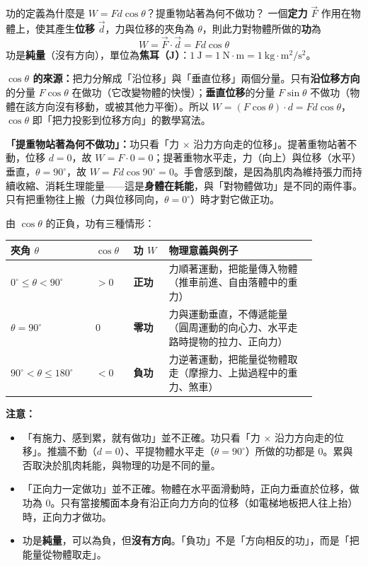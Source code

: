 \documentclass[11pt]{article}
\begin{document}
\begin{補充框}{功的定義為什麼是 $W=Fd\cos\theta$？提重物站著為何不做功？}
一個\textbf{定力} $\vec F$ 作用在物體上，使其產生\textbf{位移} $\vec d$，力與位移的夾角為 $\theta$，則此力對物體所做的\textbf{功}為
$$\boxed{\;W=\vec F\cdot\vec d=Fd\cos\theta\;}$$
功是\textbf{純量}（沒有方向），單位為\textbf{焦耳（J）}：$1\ \text{J}=1\ \text{N}\cdot\text{m}=1\ \text{kg}\cdot\text{m}^2/\text{s}^2$。

\textbf{$\cos\theta$ 的來源：}把力分解成「沿位移」與「垂直位移」兩個分量。只有\textbf{沿位移方向}的分量 $F\cos\theta$ 在做功（它改變物體的快慢）；\textbf{垂直位移}的分量 $F\sin\theta$ 不做功（物體在該方向沒有移動，或被其他力平衡）。所以 $W=(F\cos\theta)\cdot d=Fd\cos\theta$，$\cos\theta$ 即「把力投影到位移方向」的數學寫法。

\textbf{「提重物站著為何不做功」：}功只看「力 $\times$ 沿力方向走的位移」。提著重物站著不動，位移 $d=0$，故 $W=F\cdot0=0$；提著重物水平走，力（向上）與位移（水平）垂直，$\theta=90^\circ$，故 $W=Fd\cos90^\circ=0$。手會感到酸，是因為肌肉為維持張力而持續收縮、消耗生理能量——這是\textbf{身體在耗能}，與「對物體做功」是不同的兩件事。只有把重物往上搬（力與位移同向，$\theta=0^\circ$）時才對它做正功。
\end{補充框}


由 $\cos\theta$ 的正負，功有三種情形：

\begin{center}
\renewcommand{\arraystretch}{1.3}
\begin{tabular}{p{0.24\linewidth} p{0.10\linewidth} p{0.10\linewidth} p{0.42\linewidth}}
\hline
\textbf{夾角 $\theta$} & $\cos\theta$ & \textbf{功 $W$} & \textbf{物理意義與例子} \\
\hline
$0^\circ\le\theta<90^\circ$ & $>0$ & \textbf{正功} & 力順著運動，把能量傳入物體（推車前進、自由落體中的重力） \\
$\theta=90^\circ$ & $0$ & \textbf{零功} & 力與運動垂直，不傳遞能量（圓周運動的向心力、水平走路時提物的拉力、正向力） \\
$90^\circ<\theta\le180^\circ$ & $<0$ & \textbf{負功} & 力逆著運動，把能量從物體取走（摩擦力、上拋過程中的重力、煞車） \\
\hline
\end{tabular}
\end{center}

\textbf{注意：}
\begin{itemize}\setlength{\itemsep}{1pt}
\item 「有施力、感到累，就有做功」並不正確。功只看「力 $\times$ 沿力方向走的位移」。推牆不動（$d=0$）、平提物體水平走（$\theta=90^\circ$）所做的功都是 0。累與否取決於肌肉耗能，與物理的功是不同的量。
\item 「正向力一定做功」並不正確。物體在水平面滑動時，正向力垂直於位移，做功為 0。只有當接觸面本身有沿正向力方向的位移（如電梯地板把人往上抬）時，正向力才做功。
\item 功是\textbf{純量}，可以為負，但\textbf{沒有方向}。「負功」不是「方向相反的功」，而是「把能量從物體取走」。
\end{itemize}
\end{document}
